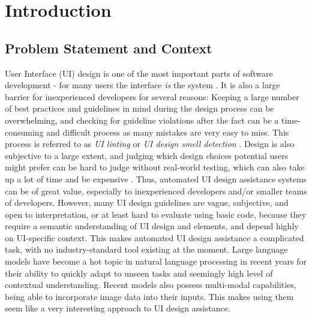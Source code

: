 \documentclass[11pt,titlepage,oneside,openany]{book}
\begin{document}
\mainmatter

\chapter{Introduction}
\label{cha:intro}

\section{Problem Statement and Context}

User Interface (UI) design is one of the most important parts of software development - for many users the interface \emph{is} the system \cite{constantine_software_1999}. It is also a large barrier for inexperienced developers for several reasons: Keeping a large number of best practices and guidelines in mind during the design process can be overwhelming, and checking for guideline violations after the fact can be a time-consuming and difficult process as many mistakes are very easy to miss. This process is referred to as \emph{UI linting} \cite{lu_ai_2024} or \emph{UI design smell detection} \cite{yang_dont_2021}. Design is also subjective to a large extent, and judging which design choices potential users might prefer can be hard to judge without real-world testing, which can also take up a lot of time and be expensive \cite{stone_user_2005}. Thus, automated UI design assistance systems can be of great value, especially to inexperienced developers and/or smaller teams of developers. However, many UI design guidelines are vague, subjective, and open to interpretation, or at least hard to evaluate using basic code, because they require a semantic understanding of UI design and elements, and depend highly on UI-specific context. This makes automated UI design assistance a complicated task, with no industry-standard tool existing at the moment. Large language models have become a hot topic in natural language processing in recent years for their ability to quickly adapt to unseen tasks and seemingly high level of contextual understanding. Recent models also possess multi-modal capabilities, being able to incorporate image data into their inputs. This makes using them seem like a very interesting approach to UI design assistance. 
\end{document}
